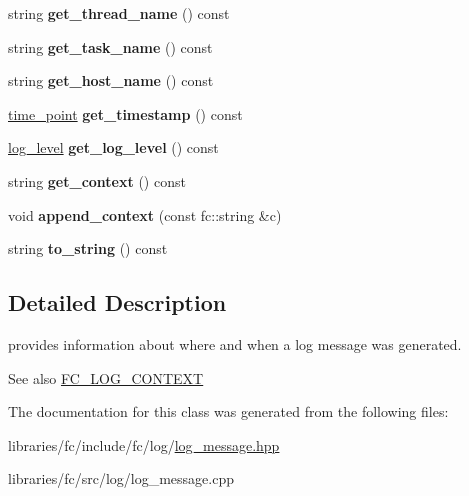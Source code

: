 \begin{DoxyCompactItemize}
string {\bfseries get\+\_\+thread\+\_\+name} () const
\item 
\mbox{\label{classfc_1_1log__context_a4293894c527a3b4997ecc53f895b6619}} 
string {\bfseries get\+\_\+task\+\_\+name} () const
\item 
\mbox{\label{classfc_1_1log__context_ac420c44f6ab4a85326525b0da4e4eb87}} 
string {\bfseries get\+\_\+host\+\_\+name} () const
\item 
\mbox{\label{classfc_1_1log__context_a68e28fbb4d7f55e2156d67196b22e07d}} 
\mbox{\hyperlink{classfc_1_1time__point}{time\+\_\+point}} {\bfseries get\+\_\+timestamp} () const
\item 
\mbox{\label{classfc_1_1log__context_a1033bff5ffa2ebdfa70ae0f9d63a7666}} 
\mbox{\hyperlink{classfc_1_1log__level}{log\+\_\+level}} {\bfseries get\+\_\+log\+\_\+level} () const
\item 
\mbox{\label{classfc_1_1log__context_afc2319fe6b9cc7bdbcbab56bc17ac5b4}} 
string {\bfseries get\+\_\+context} () const
\item 
\mbox{\label{classfc_1_1log__context_a03c5f68fae3fb1386f12a9e3aa9928c6}} 
void {\bfseries append\+\_\+context} (const fc\+::string \&c)
\item 
\mbox{\label{classfc_1_1log__context_aa3d895810b5c5598bf327328d48d3a2c}} 
string {\bfseries to\+\_\+string} () const
\end{DoxyCompactItemize}


\subsection{Detailed Description}
provides information about where and when a log message was generated. 

\begin{DoxySeeAlso}{See also}
\mbox{\hyperlink{log__message_8hpp_a123cc04b932788928fbe261f7c9bce5c}{F\+C\+\_\+\+L\+O\+G\+\_\+\+C\+O\+N\+T\+E\+XT}} 
\end{DoxySeeAlso}


The documentation for this class was generated from the following files\+:\begin{DoxyCompactItemize}
\item 
libraries/fc/include/fc/log/\mbox{\hyperlink{log__message_8hpp}{log\+\_\+message.\+hpp}}\item 
libraries/fc/src/log/log\+\_\+message.\+cpp\end{DoxyCompactItemize}

